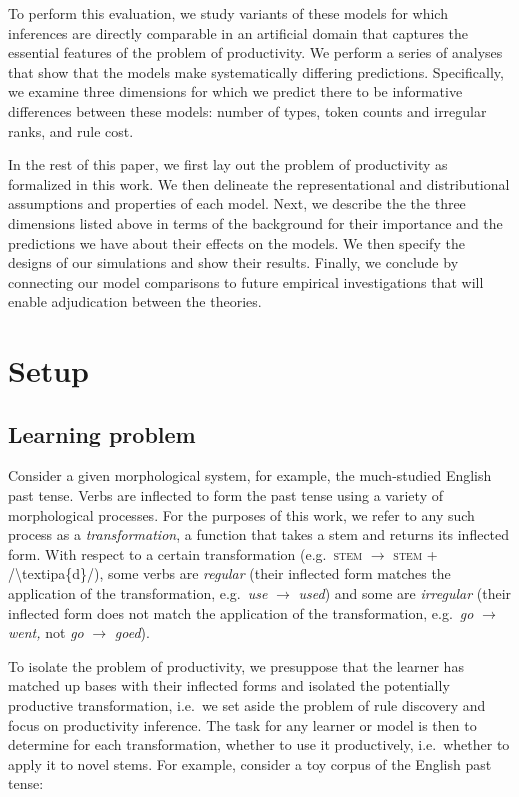 \documentclass[
   11pt,
       ]{book}
\begin{document}
To perform this evaluation, we study variants of these models for which
inferences are directly comparable in an artificial domain that captures the
essential features of the problem of productivity. We perform a series of
analyses that show that the models make systematically differing predictions.
Specifically, we examine three dimensions for which we predict there to be
informative differences between these models: number of types, token counts and
irregular ranks, and rule cost.

In the rest of this paper, we first lay out the problem of productivity as
formalized in this work. We then delineate the representational and
distributional assumptions and properties of each model. Next, we describe the
the three dimensions listed above in terms of the background for their
importance and the predictions we have about their effects on the models. We
then specify the designs of our simulations and show their results. Finally, we
conclude by connecting our model comparisons to future empirical investigations
that will enable adjudication between the theories.

\hypertarget{setup}{%
\section{Setup}\label{setup}}

\hypertarget{learning-problem}{%
\subsection{Learning problem}\label{learning-problem}}

Consider a given morphological system, for example, the much-studied English
past tense. Verbs are inflected to form the past tense using a variety of
morphological processes. For the purposes of this work, we refer to any such
process as a \emph{transformation}, a function that takes a stem and returns its
inflected form. With respect to a certain transformation (e.g.~\textsc{stem}
\(\rightarrow\) \textsc{stem} + /\textbackslash textipa\{d\}/), some verbs are \emph{regular} (their
inflected form matches the application of the transformation, e.g.~\emph{use}
\(\rightarrow\) \emph{used}) and some are \emph{irregular} (their inflected form does not
match the application of the transformation, e.g.~\emph{go} \(\rightarrow\) \emph{went,} not
\emph{go} \(\rightarrow\) \emph{goed}).

To isolate the problem of productivity, we presuppose that the learner has
matched up bases with their inflected forms and isolated the potentially
productive transformation, i.e.~we set aside the problem of rule discovery and
focus on productivity inference. The task for any learner or model is then to
determine for each transformation, whether to use it productively, i.e.~whether
to apply it to novel stems. For example, consider a toy corpus of the English
past tense:
\end{document}
